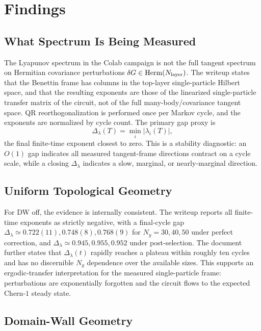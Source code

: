 \documentclass[aps,prb,onecolumn,nofootinbib,superscriptaddress]{revtex4-2}
\newcommand{\Dlambda}{\Delta_{\lambda}}
\newcommand{\Nlayer}{N_{\rm layer}}
\begin{document}
\section{Findings}

\subsection{What Spectrum Is Being Measured}

The Lyapunov spectrum in the Colab campaign is not the full tangent spectrum on
Hermitian covariance perturbations $\delta G\in{\rm Herm}(\Nlayer)$.  The
writeup states that the Benettin frame has columns in the top-layer
single-particle Hilbert space, and that the resulting exponents are those of the
linearized single-particle transfer matrix of the circuit, not of the full
many-body/covariance tangent space.  QR reorthogonalization is performed once
per Markov cycle, and the exponents are normalized by cycle count.  The primary
gap proxy is
\begin{equation}
  \Dlambda(T)=\min_i |\lambda_i(T)| ,
\end{equation}
the final finite-time exponent closest to zero.  This is a stability diagnostic:
an $O(1)$ gap indicates all measured tangent-frame directions contract on a
cycle scale, while a closing $\Dlambda$ indicates a slow, marginal, or
nearly-marginal direction.

\subsection{Uniform Topological Geometry}

For DW off, the evidence is internally consistent.  The writeup reports all
finite-time exponents as strictly negative, with a final-cycle gap
$\Dlambda\simeq0.722(11),0.748(8),0.768(9)$ for $N_y=30,40,50$ under perfect
correction, and $\Dlambda\simeq0.945,0.955,0.952$ under post-selection.  The
document further states that $\Dlambda(t)$ rapidly reaches a plateau within
roughly ten cycles and has no discernible $N_y$ dependence over the available
sizes.  This supports an ergodic-transfer interpretation for the measured
single-particle frame: perturbations are exponentially forgotten and the circuit
flows to the expected Chern-$1$ steady state.

\subsection{Domain-Wall Geometry}
\end{document}

